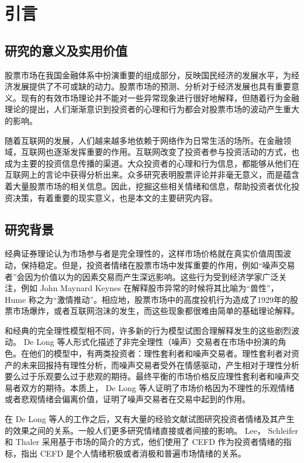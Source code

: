\chapter{引言}

\section{研究的意义及实用价值}

股票市场在我国金融体系中扮演重要的组成部分，反映国民经济的发展水平，为经济发展提供了不可或缺的动力。股票市场的预测、分析对于经济发展也具有重要意义。现有的有效市场理论并不能对一些异常现象进行很好地解释，但随着行为金融理论的提出，人们渐渐意识到投资者的心理和行为都会对股票市场的波动产生重大的影响。

随着互联网的发展，人们越来越多地依赖于网络作为日常生活的场所。在金融领域，互联网也逐渐发挥重要的作用。互联网改变了投资者参与投资活动的方式，也成为主要的投资信息传播的渠道。大众投资者的心理和行为信息，都能够从他们在互联网上的言论中获得分析出来。众多研究表明股票评论并非毫无意义，而是蕴含着大量股票市场的相关信息。因此，挖掘这些相关情绪和信息，帮助投资者优化投资决策，有着重要的现实意义，也是本文的主要研究内容。

\section{研究背景}

经典证券理论认为市场参与者是完全理性的，这样市场价格就在真实价值周围波动，保持稳定。但是，投资者情绪在股票市场中发挥重要的作用，例如“噪声交易者”会因为价值以为的因素交易而产生深远影响。这些行为受到经济学家广泛关注，例如 John Maynard Keynes 在解释股市异常的时候将其比喻为“兽性”， Hume 称之为“激情推动”。相应地，股票市场中的高度投机行为造成了1929年的股票市场爆炸，或者互联网泡沫的发生，而这些现象都很难由简单的基础理论解释。

和经典的完全理性模型相不同，许多新的行为模型试图合理解释发生的这些剧烈波动。 De Long 等人形式化描述了非完全理性（噪声）交易者在市场中扮演的角色。在他们的模型中，有两类投资者：理性套利者和噪声交易者。理性套利者对资产的未来回报持有理性分析，而噪声交易者受外在情感驱动，产生相对于理性分析要么过于乐观要么过于悲观的期待。最终平衡的市场价格反应理性套利者和噪声交易者双方的期待。本质上， De Long 等人证明了市场价格因为不理性的乐观情绪或者悲观情绪会偏离价值，证明了噪声交易者在交易中起到的作用。

在 De Long 等人的工作之后，又有大量的经验文献试图研究投资者情绪及其产生的效果之间的关系。一般人们更多研究情绪直接或者间接的影响。 Lee， Schleifer 和 Thaler 采用基于市场的简介的方式，他们使用了 CEFD 作为投资者情绪的指标，指出 CEFD 是个人情绪积极或者消极和普遍市场情绪的关系。

